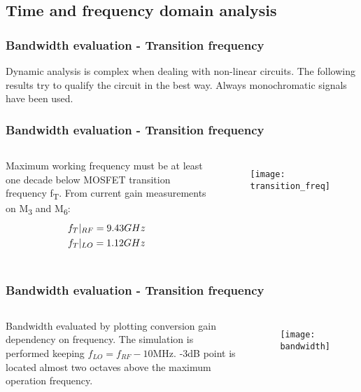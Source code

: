 \subsection{Time and frequency domain analysis}
\begin{frame}
\tableofcontents[currentsubsection]
\end{frame}

\begin{frame}
	\frametitle{Bandwidth evaluation - Transition frequency}
	Dynamic analysis is complex when dealing with non-linear circuits. The following results try to qualify the circuit in the best way.
	Always monochromatic signals have been used. 
\end{frame}

\begin{frame}
	\frametitle{Bandwidth evaluation - Transition frequency}
	\begin{columns}
	Maximum working frequency must be at least one decade below MOSFET transition frequency f\textsubscript{T}.
	From current gain measurements on M\textsubscript{3} and M\textsubscript{6}:
	\begin{gather}
		f_T|_{RF}=9.43GHz \notag \\
		f_T|_{LO}=1.12GHz \notag 
	\end{gather}  
	\begin{figure}[H]
		\centering 
		\texttt{[image: transition\_freq]}
		\label{fig:ft}
	\end{figure}
	\end{columns}
\end{frame}

\begin{frame}
\frametitle{Bandwidth evaluation - Transition frequency}
\begin{columns}
	\column{0.4\textwidth}
	Bandwidth evaluated by plotting conversion gain dependency on frequency.
	The simulation is performed keeping \(f_{LO}=f_{RF}-10\)MHz.
	-3dB point is located almost two octaves above the maximum operation frequency.
	
	\column{0.6\textwidth}
	\begin{figure}[H]
		\centering 
		\texttt{[image: bandwidth]}
		\label{fig:band}
	\end{figure}
\end{columns}
\end{frame}

